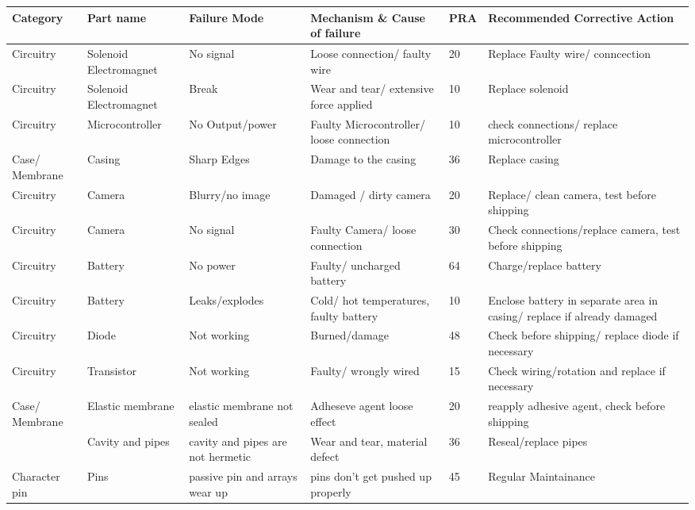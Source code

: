     \begin{table}[!ht]
        \centering
        \begin{tabular}{b{1.7cm} b{2cm} b{2.5cm} b{4cm}l b{6cm}} 
            \textbf{Category} & \textbf{Part name} & \textbf{Failure Mode} & \textbf{Mechanism \& Cause of failure} & \textbf{PRA} & \textbf{Recommended Corrective Action} \\ \hline
            Circuitry & Solenoid Electromagnet & No signal & Loose connection/ faulty wire & 20 & Replace Faulty wire/ conncection \\ 
            Circuitry & Solenoid Electromagnet & Break  & Wear and tear/ extensive force applied & 10 & Replace solenoid \\ 
            Circuitry & Microcontroller & No Output/power & Faulty Microcontroller/ loose connection & 10 & check connections/ replace microcontroller \\ 
            Case/ Membrane & Casing & Sharp Edges & Damage to the casing  & 36 & Replace casing \\ 
            Circuitry & Camera & Blurry/no image & Damaged / dirty camera & 20 & Replace/ clean camera, test before shipping \\ 
            Circuitry & Camera  & No signal & Faulty Camera/ loose connection & 30 & Check connections/replace camera, test before shipping \\ 
            Circuitry & Battery & No power & Faulty/ uncharged battery & 64 & Charge/replace battery \\ 
            Circuitry & Battery & Leaks/explodes & Cold/ hot temperatures, faulty battery & 10 & Enclose battery in separate area in casing/ replace if already damaged \\ 
            Circuitry & Diode & Not working & Burned/damage & 48 & Check before shipping/ replace diode if necessary \\ 
            Circuitry & Transistor  & Not working & Faulty/ wrongly wired & 15 & Check wiring/rotation and replace if necessary \\ 
            Case/ Membrane & Elastic membrane & elastic membrane not sealed & Adheseve agent loose effect & 20 & reapply adhesive agent, check before shipping \\ 
            ~ & Cavity and pipes & cavity and pipes are not hermetic & Wear and tear, material defect & 36 & Reseal/replace pipes \\ 
            Character pin & Pins & passive pin and arrays wear up & pins don't get pushed up properly & 45 & Regular Maintainance \\ 

\end{tabular}
\end{table}
